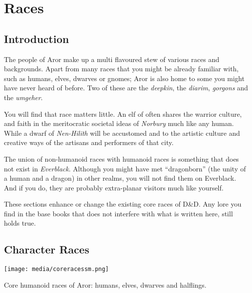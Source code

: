 \chapter{Races}
\label{sec:Races}

\section{Introduction}

The people of Aror make up a multi flavoured stew of various races and
backgrounds. Apart from many races that you might be already familiar with,
such as humans, elves, dwarves or gnomes; Aror is also home to some you might
have never heard of before. Two of these are the \emph{deepkin}, the
\emph{diarim}, \emph{gorgons} and the \emph{umgeher}.

You will find that race matters little. An elf of  often
shares the warrior culture, and faith in the meritocratic societal ideas
of \emph{Norbury} much like any human. While a dwarf of \emph{Nen-Hilith} will
be accustomed and to the artistic culture and creative ways of the artisans
and performers of that city.

The union of non-humanoid races with humanoid races is something that does
not exist in \emph{Everblack}. Although you might have met ``dragonborn''
(the unity of a human and a dragon) in other realms, you will not find them
on Everblack. And if you do, they are probably extra-planar visitors much
like yourself.

\begin{note}
These sections enhance or change the existing core races of D\&D. Any lore you
find in the base books that does not interfere with what is written here, still
holds true.
\end{note}

\section{Character Races}
\label{sec:Character Races}

\begin{figure*}[ht!]
    \centering
    \vspace{-2.6cm}
    \centerline{
        \texttt{[image: media/coreracessm.png]}
    }
    \par
    Core humanoid races of Aror: humans, elves, dwarves and halflings.
\end{figure*}

